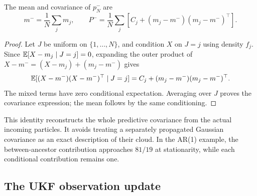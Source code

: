 \begin{proposition}
The mean and covariance of \(p_N^-\) are
\begin{equation}
\label{eq:bf-covariance-proposal-mixture-moments}
 m^-=\frac1N\sum_jm_j,\qquad
 P^-=\frac1N\sum_j\left[
 C_j+(m_j-m^-)(m_j-m^-)^\top\right].
\end{equation}
\end{proposition}
\begin{proof}
Let \(J\) be uniform on \(\{1,\ldots,N\}\), and condition \(X\) on
\(J=j\) using density \(f_j\). Since
\(\mathbb E[X-m_j\mid J=j]=0\), expanding the outer product of
\(X-m^-=(X-m_j)+(m_j-m^-)\) gives
\[
 \mathbb E[(X-m^-)(X-m^-)^\top\mid J=j]
 =C_j+(m_j-m^-)(m_j-m^-)^\top .
\]
The mixed terms have zero conditional expectation. Averaging over \(J\)
proves the covariance expression; the mean follows by the same conditioning.
\end{proof}

This identity reconstructs the whole predictive covariance from the actual
incoming particles. It avoids treating a separately propagated Gaussian
covariance as an exact description of their cloud. In the AR(1) example,
the between-ancestor contribution approaches \(81/19\) at stationarity,
while each conditional contribution remains one.

\subsection{The UKF observation update}

